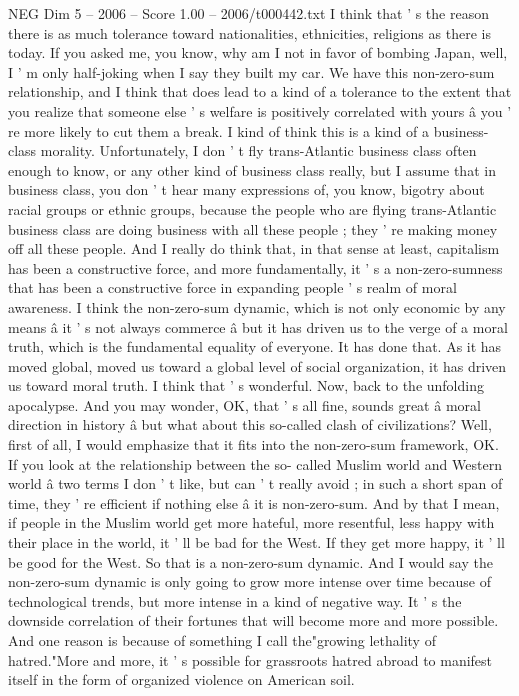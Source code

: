 \begin{textsample}{NEG Dim 5 – 2006 – Score 1.00 – 2006/t000442.txt}
I think that ' s the reason there is as much tolerance toward nationalities, ethnicities, religions as there is today.
If you asked me, you know, why am I not in favor of bombing Japan, well, I ' m only half-joking when I say they built my car.
We have this non-zero-sum relationship, and I think that does lead to a kind of a tolerance to the extent that you realize that someone else ' s welfare is positively correlated with yours â you ' re more likely to cut them a break.
I kind of think this is a kind of a business-class morality.
Unfortunately, I don ' t fly trans-Atlantic business class often enough to know, or any other kind of business class really, but I assume that in business class, you don ' t hear many expressions of, you know, bigotry about racial groups or ethnic groups, because the people who are flying trans-Atlantic business class are doing business with all these people ; they ' re making money off all these people.
And I really do think that, in that sense at least, capitalism has been a constructive force, and more fundamentally, it ' s a non-zero-sumness that has been a constructive force in expanding people ' s realm of moral awareness.
I think the non-zero-sum dynamic, which is not only economic by any means â it ' s not always commerce â but it has driven us to the verge of a moral truth, which is the fundamental equality of everyone.
It has done that.
As it has moved global, moved us toward a global level of social organization, it has driven us toward moral truth.
I think that ' s wonderful.
Now, back to the unfolding apocalypse.
And you may wonder, OK, that ' s all fine, sounds great â moral direction in history â but what about this so-called clash of civilizations?
Well, first of all, I would emphasize that it fits into the non-zero-sum framework, OK.
If you look at the relationship between the so- called Muslim world and Western world â two terms I don ' t like, but can ' t really avoid ; in such a short span of time, they ' re efficient if nothing else â it is non-zero-sum.
And by that I mean, if people in the Muslim world get more hateful, more resentful, less happy with their place in the world, it ' ll be bad for the West.
If they get more happy, it ' ll be good for the West.
So that is a non-zero-sum dynamic.
And I would say the non-zero-sum dynamic is only going to grow more intense over time because of technological trends, but more intense in a kind of negative way.
It ' s the downside correlation of their fortunes that will become more and more possible.
And one reason is because of something I call the"growing lethality of hatred."More and more, it ' s possible for grassroots hatred abroad to manifest itself in the form of organized violence on American soil.

\end{textsample}
